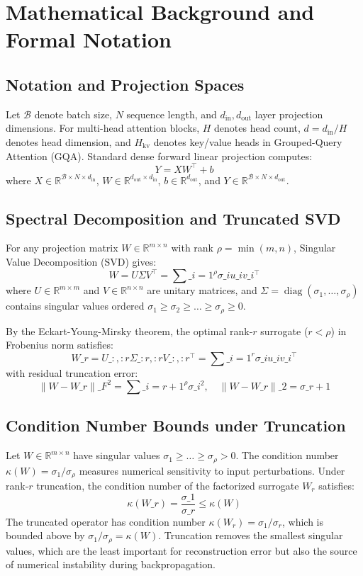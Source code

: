 \section{Mathematical Background and Formal Notation}

\subsection{Notation and Projection Spaces}
Let $\mathcal{B}$ denote batch size, $N$ sequence length, and $d_{\text{in}}, d_{\text{out}}$ layer projection dimensions. For multi-head attention blocks, $H$ denotes head count, $d = d_{\text{in}} / H$ denotes head dimension, and $H_{\text{kv}}$ denotes key/value heads in Grouped-Query Attention (GQA).
Standard dense forward linear projection computes:
\[
Y = X W^\top + b
\]
where $X \in \mathbb{R}^{\mathcal{B} \times N \times d_{\text{in}}}$, $W \in \mathbb{R}^{d_{\text{out}} \times d_{\text{in}}}$, $b \in \mathbb{R}^{d_{\text{out}}}$, and $Y \in \mathbb{R}^{\mathcal{B} \times N \times d_{\text{out}}}$.

\subsection{Spectral Decomposition and Truncated SVD}
For any projection matrix $W \in \mathbb{R}^{m \times n}$ with rank $\rho = \min(m, n)$, Singular Value Decomposition (SVD) gives:
\[
W = U \Sigma V^\top = \sum\_{i=1}^{\rho} \sigma\_i u\_i v\_i^\top
\]
where $U \in \mathbb{R}^{m \times m}$ and $V \in \mathbb{R}^{n \times n}$ are unitary matrices, and $\Sigma = \operatorname{diag}(\sigma_1, \dots, \sigma_\rho)$ contains singular values ordered $\sigma_1 \ge \sigma_2 \ge \dots \ge \sigma_\rho \ge 0$.

By the Eckart-Young-Mirsky theorem, the optimal rank-$r$ surrogate ($r < \rho$) in Frobenius norm satisfies:
\[
W\_r = U\_{:, :r} \Sigma\_{:r, :r} V\_{:, :r}^\top = \sum\_{i=1}^{r} \sigma\_i u\_i v\_i^\top
\]
with residual truncation error:
\[
\|W - W\_r\|\_F^2 = \sum\_{i=r+1}^{\rho} \sigma\_i^2, \quad \|W - W\_r\|\_2 = \sigma\_{r+1}
\]

\subsection{Condition Number Bounds under Truncation}
Let $W \in \mathbb{R}^{m \times n}$ have singular values $\sigma_1 \ge \dots \ge \sigma_\rho > 0$. The condition number $\kappa(W) = \sigma_1 / \sigma_\rho$ measures numerical sensitivity to input perturbations. Under rank-$r$ truncation, the condition number of the factorized surrogate $W_r$ satisfies:
\[
\kappa(W\_r) = \frac{\sigma\_1}{\sigma\_r} \le \kappa(W)
\]
The truncated operator has condition number $\kappa(W_r) = \sigma_1/\sigma_r$, which is bounded above by $\sigma_1/\sigma_\rho = \kappa(W)$. Truncation removes the smallest singular values, which are the least important for reconstruction error but also the source of numerical instability during backpropagation.

